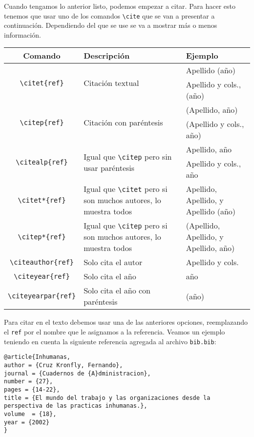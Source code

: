 	Cuando tengamos lo anterior listo, podemos empezar a citar. Para hacer esto tenemos que usar uno de los comandos \verb|\cite| que se van a presentar a continuación. Dependiendo del que se use se va a mostrar más o menos información. 
	
	\begin{tabularx}{\textwidth}{|c|X|X|}
		\hline
		Comando & Descripción & Ejemplo\\
		\hline
		\multirow{2}{*}{\verb|\citet{ref}|} & \multirow{2}{*}{Citación textual} & Apellido (año)\\
		& & Apellido y cols., (año)\\
		\hline
		\multirow{2}{*}{\verb|\citep{ref}|} & \multirow{2}{*}{Citación con paréntesis} & (Apellido, año)\\
		& & (Apellido y cols., año)\\
		\hline
		\multirow{2}{*}{\verb|\citealp{ref}|} & \multirow{2}{150pt}{Igual que \verb|\citep| pero sin usar paréntesis} & Apellido, año\\
		& & Apellido y cols., año\\
		\hline
		\verb|\citet*{ref}| & Igual que \verb|\citet| pero si son muchos autores, lo muestra todos & Apellido, Apellido, y Apellido (año)\\
		\hline
		\verb|\citep*{ref}| & Igual que \verb|\citep| pero si son muchos autores, lo muestra todos & (Apellido, Apellido, y Apellido, año)\\
		\hline
		\verb|\citeauthor{ref}| & Solo cita el autor & Apellido y cols.\\
		\hline
		\verb|\citeyear{ref}| & Solo cita el año & año\\
		\hline
		\verb|\citeyearpar{ref}| & Solo cita el año con paréntesis & (año)\\
		\hline
	\end{tabularx}

	Para citar en el texto debemos usar una de las anteriores opciones, reemplazando el \texttt{{ref}} por el nombre que le asignamos a la referencia. Veamos un ejemplo teniendo en cuenta la siguiente referencia agregada al archivo \texttt{bib.bib}:
	
	\begin{myquote}
		\begin{lstlisting}
@article{Inhumanas,
author = {Cruz Kronfly, Fernando},
journal = {Cuadernos de {A}dministracion},
number = {27},
pages = {14-22},
title = {El mundo del trabajo y las organizaciones desde la perspectiva de las practicas inhumanas.},
volume  = {18},
year = {2002}
}
		\end{lstlisting}
	\end{myquote}	
	
